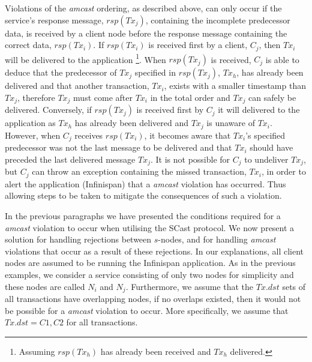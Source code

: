 
Violations of the \emph{amcast} ordering, as described above, can only occur if the service's response message, $rsp(Tx_j)$, containing the incomplete predecessor data, is received by a client node before the response message containing the correct data, $rsp(Tx_i)$.  If $rsp(Tx_i)$ is received first by a client, $C_j$, then $Tx_i$ will be delivered to the application \footnote{Assuming $rsp(Tx_h)$ has already been received and $Tx_h$ delivered.}.  When $rsp(Tx_j)$ is received, $C_j$ is able to deduce that the predecessor of $Tx_j$ specified in $rsp(Tx_j)$, $Tx_h$, has already been delivered and that another transaction, $Tx_i$, exists with a smaller timestamp than $Tx_j$, therefore $Tx_j$ must come after $Tx_i$ in the total order and $Tx_j$ can safely be delivered. Conversely, if $rsp(Tx_j)$ is received first by $C_j$ it will delivered to the application as $Tx_h$ has already been delivered and $Tx_j$ is unaware of $Tx_i$.  However, when $C_j$ receives $rsp(Tx_i)$, it becomes aware that $Tx_i$'s specified predecessor was not the last message to be delivered and that $Tx_i$ should have preceded the last delivered message $Tx_j$.  It is not possible for $C_j$ to undeliver $Tx_j$, but $C_j$ can throw an exception containing the missed transaction, $Tx_i$, in order to alert the application (Infinispan) that a \emph{amcast} violation has occurred.  Thus allowing steps to be taken to mitigate the consequences of such a violation.  

In the previous paragraphs we have presented the conditions required for a \emph{amcast} violation to occur when utilising the \textsf{SCast} protocol.  We now present a solution for handling rejections between $s$-nodes, and for handling \emph{amcast} violations that occur as a result of these rejections.  In our explanations, all client nodes are assumed to be running the Infinispan application.  As in the previous examples, we consider a service consisting of only two nodes for simplicity and these nodes are called $N_i$ and $N_j$.  Furthermore, we assume that the $Tx.dst$ sets of all transactions have overlapping nodes, if no overlaps existed, then it would not be possible for a \emph{amcast} violation to occur.  More specifically, we assume that $Tx.dst = {C1,C2}$ for all transactions.  

